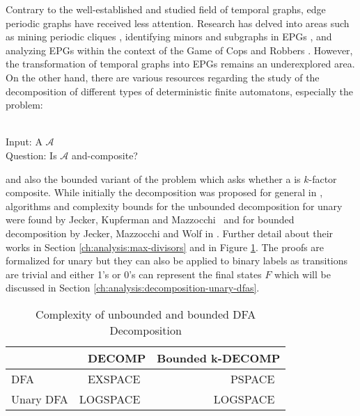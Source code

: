 Contrary to the well-established and studied field of temporal graphs, edge periodic graphs have received less attention.
Research has delved into areas such as mining periodic cliques \cite{clique-mining-epg}, identifying minors and subgraphs in EPGs \cite{minor-subgraph-epg}, and analyzing EPGs within the context of the Game of Cops and Robbers \cite{erlebach2020game}.
However, the transformation of temporal graphs into EPGs remains an underexplored area.
On the other hand, there are various resources regarding the study of the decomposition of different types of deterministic finite automatons, especially the problem:
\begin{defn}{\ \\}
	Input: A \DFA $\mathcal{A}$\\
	Question: Is $\mathcal{A}$ and-composite?
\end{defn}
and also the bounded variant of the problem which asks whether a \DFA is $k$-factor composite. While initially the decomposition was proposed for general \DFAs in \cite{prime-languages}, algorithms and complexity bounds for the unbounded decomposition for unary \DFAs were found by Jecker, Kupferman and Mazzocchi~\cite{unara-prime-languages} and for bounded decomposition by Jecker, Mazzocchi and Wolf in \cite{DBLP:journals/corr/abs-2107-04683}.
Further detail about their works in Section \ref{ch:analysis:max-divisors} and in Figure \ref{tab:dfa-decomp-complexity}.
The proofs are formalized for unary \DFAs but they can also be applied to binary labels as transitions are trivial and either 1's or 0's can represent the final states $F$ which will be discussed in Section \ref{ch:analysis:decomposition-unary-dfas}.
\begin{table}[h]
	\centering
	\begin{tabular}{l|rr}
		&  DECOMP & Bounded k-DECOMP  \\
		\hline
		DFA & EXSPACE~\cite{prime-languages} & PSPACE~\cite{DBLP:journals/corr/abs-2107-04683}  \\
		Unary DFA & LOGSPACE~\cite{unara-prime-languages} &  LOGSPACE~\cite{DBLP:journals/corr/abs-2107-04683}
	\end{tabular}
	\caption{Complexity of unbounded and bounded DFA Decomposition}
	\label{tab:dfa-decomp-complexity}
\end{table}


